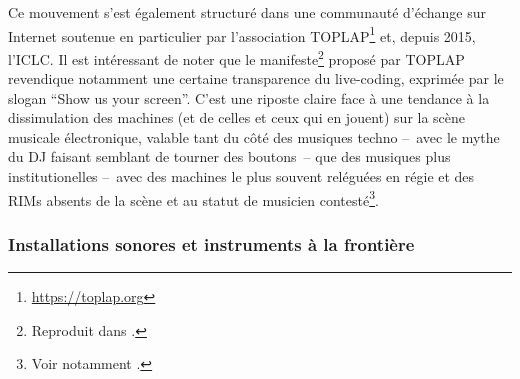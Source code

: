 \indent Ce mouvement s'est également structuré dans une communauté d'échange sur Internet soutenue en particulier par l'association TOPLAP\footnote{\url{https://toplap.org}} et, depuis 2015, l'\gls{ICLC}. Il est intéressant de noter que le manifeste\footnote{Reproduit dans \cite{blackwell_programming_2005}.} proposé par TOPLAP revendique notamment une certaine transparence du live-coding, exprimée par le slogan ``Show us your screen''. C'est une riposte claire face à une tendance à la dissimulation des machines (et de celles et ceux qui en jouent) sur la scène musicale électronique, valable tant du côté des musiques techno --~avec le mythe du \gls{DJ} faisant semblant de tourner des boutons~-- que des musiques plus institutionelles --~avec des machines le plus souvent reléguées en régie et des \glspl{RIM} absents de la scène et au statut de musicien contesté\footnote{Voir notamment \cite{zattra_les_2013}.}.


\subsubsection{Installations sonores et instruments à la frontière}


